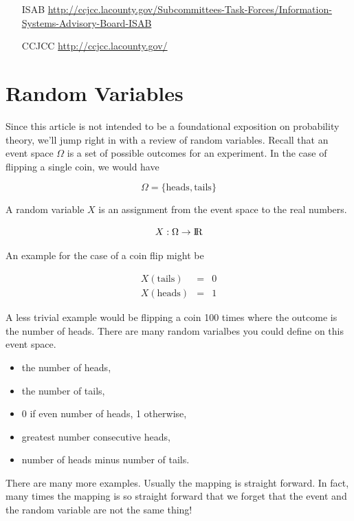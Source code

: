 \documentclass[]{article}
\begin{document}
\begin{itemize}
\item[ISAB] \href{http://ccjcc.lacounty.gov/Subcommittees-Task-Forces/Information-Systems-Advisory-Board-ISAB}{http://ccjcc.lacounty.gov/Subcommittees-Task-Forces/Information-Systems-Advisory-Board-ISAB}
\item[CCJCC] \href{http://ccjcc.lacounty.gov/}{http://ccjcc.lacounty.gov/}
\end{itemize}

\section*{Random Variables}

Since this article is not intended to be a foundational exposition on
probability theory, we'll jump right in with a review of random variables.
Recall that an event space $\Omega$ is a set of possible outcomes for an
experiment.  In the case of flipping a single coin, we would have

$$
\Omega = \{\mbox{heads}, \mbox{tails}\}
$$

A random variable $X$ is an assignment from the event space to the real
numbers.

$$
X: \Omega \rightarrow {\rm I\!R}
$$

An example for the case of a coin flip might be

\begin{eqnarray*}
X(\mbox{tails}) & = & 0\\
X(\mbox{heads}) & = & 1
\end{eqnarray*}

A less trivial example would be flipping a coin 100 times where
the outcome is the number of heads.  There are many random varialbes
you could define on this event space.

\begin{itemize}
\item the number of heads,
\item the number of tails,
\item 0 if even number of heads, 1 otherwise,
\item greatest number consecutive heads,
\item number of heads minus number of tails.
\end{itemize}

There are many more examples.  Usually the mapping is straight
forward.  In fact, many times the mapping is so straight forward
that we forget that the event and the random variable are not the
same thing!
\end{document}
